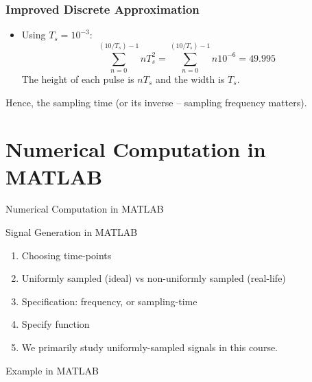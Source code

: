 \documentclass[aspectratio=169,xcolor=dvipsnames,svgnames,x11names,fleqn]{beamer}
\begin{document}
\begin{frame}
\frametitle{Improved Discrete Approximation}
\begin{itemize}
    \item Using \( T_s = 10^{-3} \):
    $$
    \sum_{n=0}^{(10/T_s)-1} nT_s^2 = \sum_{n=0}^{(10/T_s)-1} n 10^{-6} = 49.995
    $$
    The height of each pulse is $nT_s$ and the width is $T_s$.
\end{itemize}

Hence, the sampling time (or its inverse -- sampling frequency matters).
\end{frame}


\section{Numerical Computation in MATLAB}



\begin{frame}{}
    \begin{center}
    \Huge \bf \color{DarkBlue}
    \faFire
    
Numerical Computation in MATLAB

\end{center}
\end{frame}


\begin{frame}[containsverbatim]{Signal Generation in MATLAB}

\begin{enumerate}
\item Choosing time-points
\item Uniformly sampled (ideal) vs non-uniformly sampled (real-life)
\item Specification: frequency, or sampling-time
\item Specify function
\item We primarily study uniformly-sampled signals in this course.
\end{enumerate}

\end{frame}

\begin{frame}[containsverbatim]{Example in MATLAB}


\end{frame}
\end{document}
